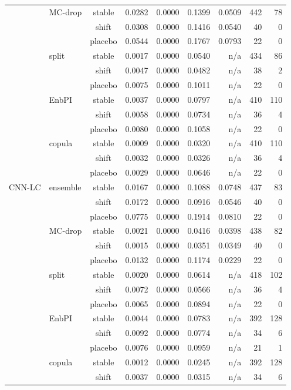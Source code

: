 {\begin{longtable}{@{}llcrrrrrr@{}}
 & MC-drop & stable & 0.0282 & 0.0000 & 0.1399 & 0.0509 & 442 & 78 \\
 &  & shift & 0.0308 & 0.0000 & 0.1416 & 0.0540 & 40 & 0 \\
 &  & placebo & 0.0544 & 0.0000 & 0.1767 & 0.0793 & 22 & 0 \\
 & split & stable & 0.0017 & 0.0000 & 0.0540 & n/a & 434 & 86 \\
 &  & shift & 0.0047 & 0.0000 & 0.0482 & n/a & 38 & 2 \\
 &  & placebo & 0.0075 & 0.0000 & 0.1011 & n/a & 22 & 0 \\
 & EnbPI & stable & 0.0037 & 0.0000 & 0.0797 & n/a & 410 & 110 \\
 &  & shift & 0.0058 & 0.0000 & 0.0734 & n/a & 36 & 4 \\
 &  & placebo & 0.0080 & 0.0000 & 0.1058 & n/a & 22 & 0 \\
 & copula & stable & 0.0009 & 0.0000 & 0.0320 & n/a & 410 & 110 \\
 &  & shift & 0.0032 & 0.0000 & 0.0326 & n/a & 36 & 4 \\
 &  & placebo & 0.0029 & 0.0000 & 0.0646 & n/a & 22 & 0 \\
\addlinespace[2pt]
CNN-LC & ensemble & stable & 0.0167 & 0.0000 & 0.1088 & 0.0748 & 437 & 83 \\
 &  & shift & 0.0172 & 0.0000 & 0.0916 & 0.0546 & 40 & 0 \\
 &  & placebo & 0.0775 & 0.0000 & 0.1914 & 0.0810 & 22 & 0 \\
 & MC-drop & stable & 0.0021 & 0.0000 & 0.0416 & 0.0398 & 438 & 82 \\
 &  & shift & 0.0015 & 0.0000 & 0.0351 & 0.0349 & 40 & 0 \\
 &  & placebo & 0.0132 & 0.0000 & 0.1174 & 0.0229 & 22 & 0 \\
 & split & stable & 0.0020 & 0.0000 & 0.0614 & n/a & 418 & 102 \\
 &  & shift & 0.0072 & 0.0000 & 0.0566 & n/a & 36 & 4 \\
 &  & placebo & 0.0065 & 0.0000 & 0.0894 & n/a & 22 & 0 \\
 & EnbPI & stable & 0.0044 & 0.0000 & 0.0783 & n/a & 392 & 128 \\
 &  & shift & 0.0092 & 0.0000 & 0.0774 & n/a & 34 & 6 \\
 &  & placebo & 0.0076 & 0.0000 & 0.0959 & n/a & 21 & 1 \\
 & copula & stable & 0.0012 & 0.0000 & 0.0245 & n/a & 392 & 128 \\
 &  & shift & 0.0037 & 0.0000 & 0.0315 & n/a & 34 & 6 \\

\end{longtable}}
